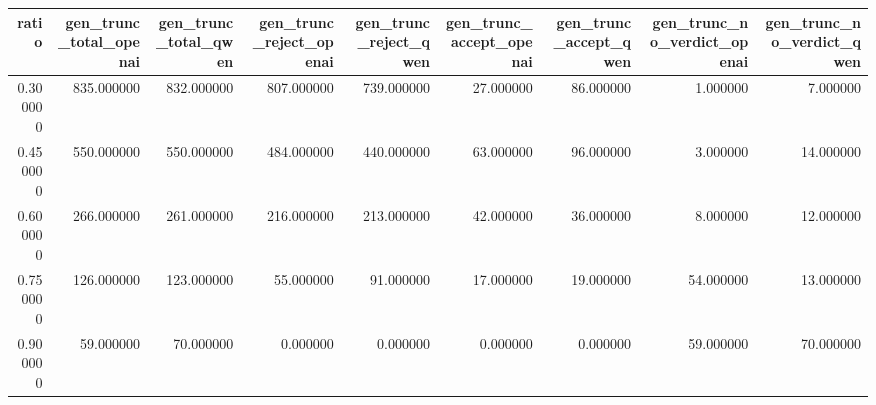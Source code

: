 \begin{tabular}{rrrrrrrrr}
\toprule
ratio & gen_trunc_total_openai & gen_trunc_total_qwen & gen_trunc_reject_openai & gen_trunc_reject_qwen & gen_trunc_accept_openai & gen_trunc_accept_qwen & gen_trunc_no_verdict_openai & gen_trunc_no_verdict_qwen \\
\midrule
0.300000 & 835.000000 & 832.000000 & 807.000000 & 739.000000 & 27.000000 & 86.000000 & 1.000000 & 7.000000 \\
0.450000 & 550.000000 & 550.000000 & 484.000000 & 440.000000 & 63.000000 & 96.000000 & 3.000000 & 14.000000 \\
0.600000 & 266.000000 & 261.000000 & 216.000000 & 213.000000 & 42.000000 & 36.000000 & 8.000000 & 12.000000 \\
0.750000 & 126.000000 & 123.000000 & 55.000000 & 91.000000 & 17.000000 & 19.000000 & 54.000000 & 13.000000 \\
0.900000 & 59.000000 & 70.000000 & 0.000000 & 0.000000 & 0.000000 & 0.000000 & 59.000000 & 70.000000 \\
\bottomrule
\end{tabular}
